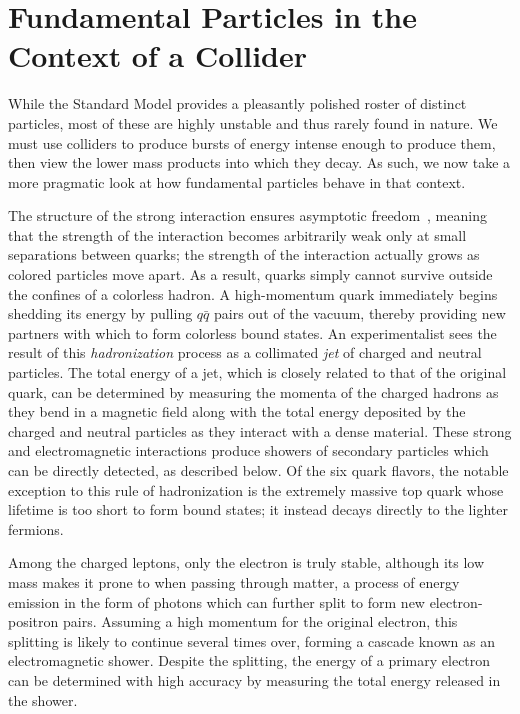 \section{Fundamental Particles in the Context of a Collider}
While the Standard Model provides a pleasantly polished roster of distinct particles, most of these are highly unstable and thus rarely found in nature.  We must use colliders to produce bursts of energy intense enough to produce them, then view the lower mass products into which they decay.  As such, we now take a more pragmatic look at how fundamental particles behave in that context.

The structure of the strong interaction ensures asymptotic freedom~\cite{PhysRevLett.30.1343}, meaning that the strength of the interaction becomes arbitrarily weak only at small separations between quarks; the strength of the interaction actually grows as colored particles move apart.  As a result, quarks simply cannot survive outside the confines of a colorless hadron.  A high-momentum quark immediately begins shedding its energy by pulling $q\bar{q}$ pairs out of the vacuum, thereby providing new partners with which to form colorless bound states.  An experimentalist sees the result of this \emph{hadronization} process as a collimated \emph{jet} of charged and neutral particles.  The total energy of a jet, which is closely related to that of the original quark, can be determined by measuring the momenta of the charged hadrons as they bend in a magnetic field along with the total energy deposited by the charged and neutral particles as they interact with a dense material.  These strong and electromagnetic interactions produce showers of secondary particles which can be directly detected, as described below.  Of the six quark flavors, the notable exception to this rule of hadronization is the extremely massive top quark whose lifetime is too short to form bound states; it instead decays directly to the lighter fermions.

Among the charged leptons, only the electron is truly stable, although its low mass makes it prone to \brem when passing through matter, a process of energy emission in the form of photons which can further split to form new electron-positron pairs.  Assuming a high momentum for the original electron, this splitting is likely to continue several times over, forming a cascade known as an electromagnetic shower.  Despite the splitting, the energy of a primary electron can be determined with high accuracy by measuring the total energy released in the shower.

